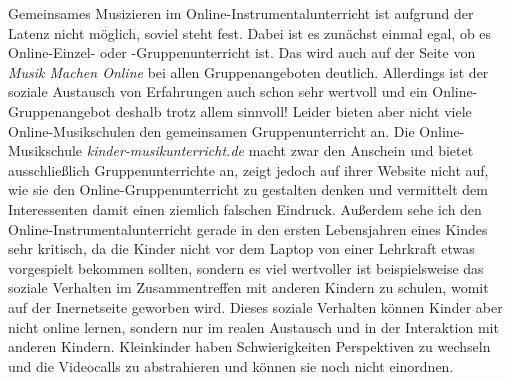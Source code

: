 Gemeinsames Musizieren im Online-Instrumentalunterricht ist aufgrund der Latenz
nicht möglich, soviel steht fest. Dabei ist es zunächst einmal egal, ob es
Online-Einzel- oder -Gruppenunterricht ist. Das wird auch auf der Seite von
\emph{Musik Machen Online} bei allen Gruppenangeboten deutlich. Allerdings ist
der soziale Austausch von Erfahrungen auch schon sehr wertvoll und ein
Online-Gruppenangebot deshalb trotz allem sinnvoll! Leider bieten aber nicht
viele Online-Musikschulen den gemeinsamen Gruppenunterricht an. Die
Online-Musikschule \emph{kinder-musikunterricht.de} macht zwar den Anschein und
bietet ausschließlich Gruppenunterrichte an, zeigt jedoch auf ihrer Website
nicht auf, wie sie den Online-Gruppenunterricht zu gestalten denken und
vermittelt dem Interessenten damit einen ziemlich falschen Eindruck. Außerdem
sehe ich den Online-Instrumentalunterricht gerade in den ersten Lebensjahren
eines Kindes sehr kritisch, da die Kinder nicht vor dem Laptop von einer
Lehrkraft etwas vorgespielt bekommen sollten, sondern es viel wertvoller ist
beispielsweise das soziale Verhalten im Zusammentreffen mit anderen Kindern zu
schulen, womit auf der Inernetseite geworben wird. Dieses soziale Verhalten
können Kinder aber nicht online lernen, sondern nur im realen Austausch und in
der Interaktion mit anderen Kindern. Kleinkinder haben Schwierigkeiten
Perspektiven zu wechseln und die Videocalls zu abstrahieren und können sie noch
nicht einordnen.


